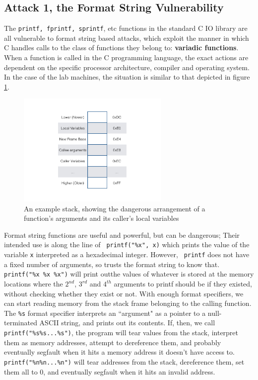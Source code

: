 \subsection{Attack 1, the Format String Vulnerability}

The {\tt printf, fprintf, sprintf}, etc functions in the standard C IO library are all vulnerable to format string based
attacks, which exploit the manner in which C handles calls to the class of functions they belong to: \textbf{variadic
functions}\cite{vfunc}. When a function is called in the C programming language,\cite{call_conv} the exact actions are
dependent on the specific processor architecture, compiler and operating system. In the case of the lab machines, the
situation is similar to that depicted in figure \ref{fig_stack}.

\begin{figure}[ht] \centering \includegraphics[width = 0.65\textwidth]{./images/stack.jpg} \caption{An example stack,
showing the dangerous arrangement of a function's arguments and its caller's local variables} \label{fig_stack}
\end{figure}

Format string functions are useful and powerful, but can be dangerous; Their intended use is along the line of {\tt
printf("\%x", x)} which prints the value of the variable {\tt x} interpreted as a hexadecimal integer. However, {\tt
printf} does not have a fixed number of arguments, so trusts the format string to know that. {\tt printf("\%x \%x \%x")}
will print outthe values of whatever is stored at the memory locations where the $2^{nd}$, $3^{rd}$ and $4^{th}$
arguments to printf should be if they existed, without checking whether they exist or not. With enough format
specifiers, we can start reading memory from the stack frame belonging to the calling function. The {\tt \%s} format
specifier interprets an ``argument" as a pointer to a null-terminated ASCII string, and prints out its contents. If,
then, we call {\tt printf("\%s\%s...\%s")}, the program will tear values from the stack, interpret them as memory
addresses, attempt to dereference them, and probably eventually segfault when it hits a memory address it doesn't have
access to. {\tt printf("\%n\%n...\%n")} will tear addresses from the stack, dereference them, set them all to 0, and
eventually segfault when it hits an invalid address.

